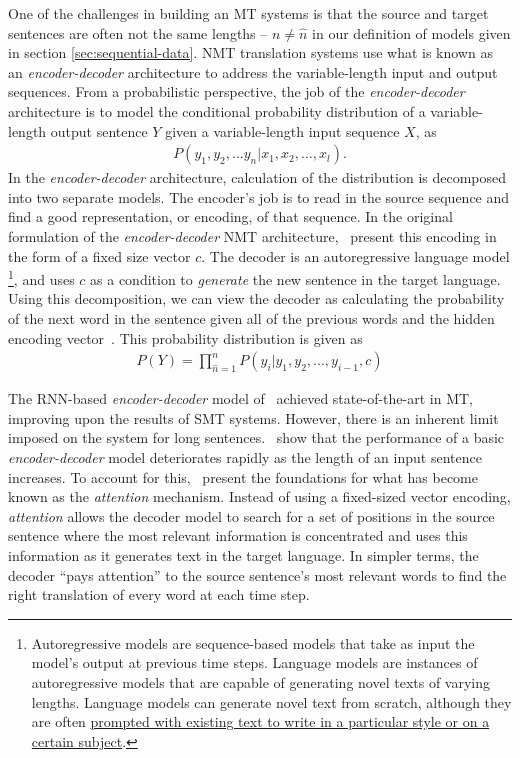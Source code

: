 \newcommand{\ed}{\emph{encoder-decoder}}
One of the challenges in building an MT systems is that the source and target sentences are often not the same lengths -- $n \neq \hat{n}$ in our definition of \seq{} models given in section \ref{sec:sequential-data}. NMT translation systems use what is known as an \ed{} architecture to address the variable-length input and output sequences. From a probabilistic perspective, the job of the \ed{} architecture is to model the conditional probability distribution of a variable-length output sentence $Y$ given a variable-length input sequence $X$, as
\begin{align*}
P(y_1, y_2, ... y_n | x_1, x_2, ..., x_l). 
\end{align*}
In the \ed{} architecture, calculation of the distribution is decomposed into two separate models. The encoder's job is to read in the source sequence and find a good representation, or encoding, of that sequence. In the original formulation of the \ed{} NMT architecture,~\citet{cho2014learning} present this encoding in the form of a fixed size vector $c$. The decoder is an autoregressive language model%
\footnote{Autoregressive models are sequence-based models that take as input the model's output at previous time steps. Language models are instances of autoregressive models that are capable of generating novel texts of varying lengths. Language models can generate novel text from scratch, although they are often \href{https://transformer.huggingface.co/doc/distil-gpt2}{prompted with existing text to write in a particular style or on a certain subject}.}, and uses $c$ as a condition to \emph{generate} the new sentence in the target language. Using this decomposition, we can view the decoder as calculating the probability of the next word in the sentence given all of the previous words and the hidden encoding vector~\cite{bahdanau2014neural}. This probability distribution is given as
\begin{align*}
P(Y) = \prod_{\hat{n}=1}^{n}P(y_i \vert y_1, y_2, ..., y_{i-1}, c)    
\end{align*}


\newcommand{\at}[1]{\emph{#1}}

The RNN-based \ed{} model of~\citet{cho2014learning} achieved state-of-the-art in MT, improving upon the results of SMT systems. However, there is an inherent limit imposed on the system for long sentences.~\citet{cho2014learning} show that the performance of a basic \ed{} model deteriorates rapidly as the length of an input sentence increases. To account for this,~\citet{bahdanau2014neural} present the foundations for what has become known as the \at{attention} mechanism. Instead of using a fixed-sized vector encoding, \at{attention} allows the decoder model to search for a set of positions in the source sentence where the most relevant information is concentrated and uses this information as it generates text in the target language. In simpler terms, the decoder ``pays attention'' to the source sentence's most relevant words to find the right translation of every word at each time step. 


